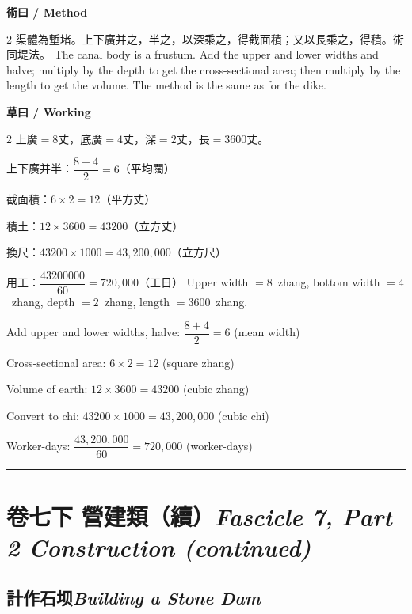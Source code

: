 \documentclass[11pt,a4paper]{article}
\newcommand{\bilingualsection}[2]{\section{#1\hfill\textit{\small #2}}}
\newcommand{\bilingualsubsection}[2]{\subsection{#1\quad\textit{#2}}}
\newcommand{\longline}{\noindent\rule{\textwidth}{0.4pt}}
\begin{document}
\vspace{0.4em}
\noindent\textbf{\textcolor{chinesecolor}{術曰} / \textcolor{englishcolor}{Method}}
\vspace{0.2em}
\begin{paracol}{2}
渠體為塹堵。上下廣并之，半之，以深乘之，得截面積；又以長乘之，得積。術同堤法。
\switchcolumn
The canal body is a frustum. Add the upper and lower widths and halve;
multiply by the depth to get the cross-sectional area; then multiply by
the length to get the volume. The method is the same as for the dike.
\end{paracol}

\vspace{0.4em}
\noindent\textbf{\textcolor{chinesecolor}{草曰} / \textcolor{englishcolor}{Working}}
\vspace{0.2em}
\begin{paracol}{2}
上廣$=8$丈，底廣$=4$丈，深$=2$丈，長$=3600$丈。

上下廣并半：$\dfrac{8+4}{2} = 6$（平均闊）

截面積：$6 \times 2 = 12$（平方丈）

積土：$12 \times 3600 = 43200$（立方丈）

換尺：$43200 \times 1000 = 43{,}200{,}000$（立方尺）

用工：$\dfrac{43200000}{60} = 720{,}000$（工日）
\switchcolumn
Upper width $= 8$~zhang, bottom width $= 4$~zhang, depth $= 2$~zhang,
length $= 3600$~zhang.

Add upper and lower widths, halve: $\dfrac{8+4}{2} = 6$ (mean width)

Cross-sectional area: $6 \times 2 = 12$ (square zhang)

Volume of earth: $12 \times 3600 = 43200$ (cubic zhang)

Convert to chi: $43200 \times 1000 = 43{,}200{,}000$ (cubic chi)

Worker-days: $\dfrac{43{,}200{,}000}{60} = 720{,}000$ (worker-days)
\end{paracol}

\vspace{0.5em}
\longline


\newpage
\bilingualsection{卷七下 \quad 營建類（續）}{Fascicle 7, Part 2 \quad Construction (continued)}
\label{sec:fasc7b}

\bilingualsubsection{計作石坝}{Building a Stone Dam}
\end{document}
